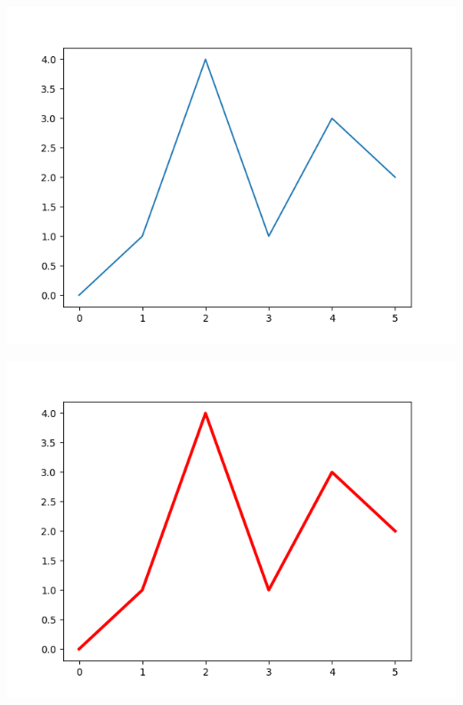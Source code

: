 \documentclass[11pt,class=report,crop=false]{standalone}
\begin{document}
\begin{minipage}{0.32\textwidth}
\begin{center}
\includegraphics[scale=\myscale,scale=0.35]{figures/pythonx-plot1}
\scriptsize {}
\end{center}
\end{minipage}
\begin{minipage}{0.32\textwidth}
\begin{center}
\includegraphics[scale=\myscale,scale=0.35]{figures/pythonx-plot2}
\scriptsize {}
\end{center}
\end{minipage}
\end{document}
